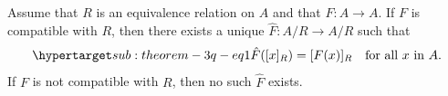 \documentclass{report}
\begin{document}
\subsection{}%

  \begin{theorem}[3Q]
    Assume that $R$ is an equivalence relation on $A$ and that
      $F \colon A \rightarrow A$.
    If $F$ is compatible with $R$, then there exists a unique
      $\hat{F} \colon A / R \rightarrow A / R$ such that
      \begin{equation}
        \hyperlabel{sub:theorem-3q-eq1}
        \hat{F}([x]_R) = [F(x)]_R \quad\text{for all } x \text{ in } A.
      \end{equation}
    If $F$ is not compatible with $R$, then no such $\hat{F}$ exists.
  \end{theorem}
\end{document}

